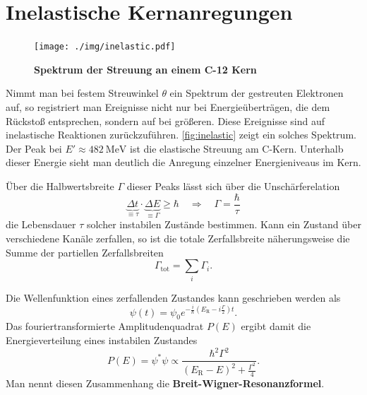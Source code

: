 \section{Inelastische Kernanregungen}
\begin{figure}
	\centering
	\texttt{[image: ./img/inelastic.pdf]}
	\caption{\textbf{Spektrum der Streuung an einem C-12 Kern}}
	\label{fig:inelastic}
\end{figure}
Nimmt man bei festem Streuwinkel $\theta$ ein Spektrum der gestreuten Elektronen auf, so registriert man Ereignisse nicht nur bei Energieüberträgen, die dem Rückstoß entsprechen,
sondern auf bei größeren.
Diese Ereignisse sind auf inelastische Reaktionen zurückzuführen.
\autoref{fig:inelastic} zeigt ein solches Spektrum.
Der Peak bei $E'\approx\SI{482}{\MeV}$ ist die elastische Streuung am C-Kern.
Unterhalb dieser Energie sieht man deutlich die Anregung einzelner Energieniveaus im Kern.

Über die Halbwertsbreite $\Gamma$ dieser Peaks lässt sich über die Unschärferelation
\begin{equation*}
	\underbrace{\Delta t}_{\equiv\tau}\cdot\underbrace{\Delta E}_{\equiv\Gamma} \geq \hbar\quad \Rightarrow\quad \Gamma = \frac{\hbar}{\tau}
\end{equation*}
die Lebensdauer $\tau$ solcher instabilen Zustände bestimmen.
Kann ein Zustand über verschiedene Kanäle zerfallen, so ist die totale Zerfallsbreite näherungsweise die Summe der partiellen Zerfallsbreiten
\begin{equation*}
	\Gamma_\text{tot} = \sum_i \Gamma_i.
\end{equation*}

Die Wellenfunktion eines zerfallenden Zustandes kann geschrieben werden als
\begin{equation*}
	\psi(t) = \psi_0e^{-\frac{i}{\hbar}\left(E_\text{R}-i\frac{\Gamma}{2}\right)t}.
\end{equation*}
Das fouriertransformierte Amplitudenquadrat $P(E)$ ergibt damit die Energieverteilung eines instabilen Zustandes
\begin{equation*}
	P(E) = \psi^*\psi\propto \frac{\hbar^2\Gamma^2}{(E_\text{R}-E)^2+\frac{\Gamma^2}{4}}.
\end{equation*}
Man nennt diesen Zusammenhang die \textbf{Breit-Wigner-Resonanzformel}.
